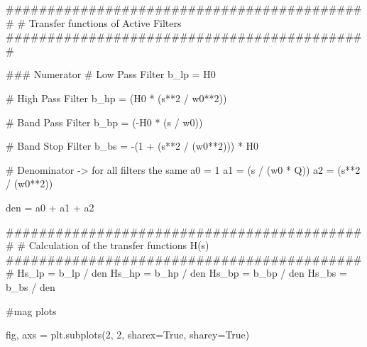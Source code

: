 \documentclass[
  letterpaper,
]{scrbook}
\newenvironment{Shaded}{}{}
\newcommand{\CommentTok}[1]{\textcolor[rgb]{0.42,0.45,0.49}{#1}}
\newcommand{\DecValTok}[1]{\textcolor[rgb]{0.00,0.36,0.77}{#1}}
\newcommand{\NormalTok}[1]{\textcolor[rgb]{0.14,0.16,0.18}{#1}}
\newcommand{\OperatorTok}[1]{\textcolor[rgb]{0.14,0.16,0.18}{#1}}
\newcommand{\VariableTok}[1]{\textcolor[rgb]{0.89,0.38,0.04}{#1}}
\begin{document}
\begin{codelisting}
{\begin{Shaded}
\begin{Highlighting}[]
\CommentTok{\#\#\#\#\#\#\#\#\#\#\#\#\#\#\#\#\#\#\#\#\#\#\#\#\#\#\#\#\#\#\#\#\#\#\#\#\#\#\#\#\#\#\#\#}
\CommentTok{\# Transfer functions of Active Filters}
\CommentTok{\#\#\#\#\#\#\#\#\#\#\#\#\#\#\#\#\#\#\#\#\#\#\#\#\#\#\#\#\#\#\#\#\#\#\#\#\#\#\#\#\#\#\#\#}


\CommentTok{\#\#\# Numerator}
\CommentTok{\# Low Pass Filter}
\NormalTok{b\_lp }\OperatorTok{=}\NormalTok{ H0}

\CommentTok{\# High Pass Filter}
\NormalTok{b\_hp }\OperatorTok{=}\NormalTok{ (H0 }\OperatorTok{*}\NormalTok{ (s}\OperatorTok{**}\DecValTok{2} \OperatorTok{/}\NormalTok{ w0}\OperatorTok{**}\DecValTok{2}\NormalTok{))}

\CommentTok{\# Band Pass Filter}
\NormalTok{b\_bp }\OperatorTok{=}\NormalTok{ (}\OperatorTok{{-}}\NormalTok{H0 }\OperatorTok{*}\NormalTok{ (s }\OperatorTok{/}\NormalTok{ w0))}

\CommentTok{\# Band Stop Filter}
\NormalTok{b\_bs }\OperatorTok{=} \OperatorTok{{-}}\NormalTok{(}\DecValTok{1} \OperatorTok{+}\NormalTok{ (s}\OperatorTok{**}\DecValTok{2} \OperatorTok{/}\NormalTok{ (w0}\OperatorTok{**}\DecValTok{2}\NormalTok{))) }\OperatorTok{*}\NormalTok{ H0}

\CommentTok{\# Denominator {-}\textgreater{} for all filters the same}
\NormalTok{a0 }\OperatorTok{=} \DecValTok{1}
\NormalTok{a1 }\OperatorTok{=}\NormalTok{ (s }\OperatorTok{/}\NormalTok{ (w0 }\OperatorTok{*}\NormalTok{ Q))}
\NormalTok{a2 }\OperatorTok{=}\NormalTok{ (s}\OperatorTok{**}\DecValTok{2} \OperatorTok{/}\NormalTok{ (w0}\OperatorTok{**}\DecValTok{2}\NormalTok{))}

\NormalTok{den }\OperatorTok{=}\NormalTok{ a0 }\OperatorTok{+}\NormalTok{ a1 }\OperatorTok{+}\NormalTok{ a2}

\CommentTok{\#\#\#\#\#\#\#\#\#\#\#\#\#\#\#\#\#\#\#\#\#\#\#\#\#\#\#\#\#\#\#\#\#\#\#\#\#\#\#\#\#\#\#\#}
\CommentTok{\# Calculation of the transfer functions H(s)}
\CommentTok{\#\#\#\#\#\#\#\#\#\#\#\#\#\#\#\#\#\#\#\#\#\#\#\#\#\#\#\#\#\#\#\#\#\#\#\#\#\#\#\#\#\#\#\#}
\NormalTok{Hs\_lp }\OperatorTok{=}\NormalTok{ b\_lp }\OperatorTok{/}\NormalTok{ den}
\NormalTok{Hs\_hp }\OperatorTok{=}\NormalTok{ b\_hp }\OperatorTok{/}\NormalTok{ den}
\NormalTok{Hs\_bp }\OperatorTok{=}\NormalTok{ b\_bp }\OperatorTok{/}\NormalTok{ den}
\NormalTok{Hs\_bs }\OperatorTok{=}\NormalTok{ b\_bs }\OperatorTok{/}\NormalTok{ den}

\CommentTok{\#mag plots}

\NormalTok{fig, axs }\OperatorTok{=}\NormalTok{ plt.subplots(}\DecValTok{2}\NormalTok{, }\DecValTok{2}\NormalTok{, sharex}\OperatorTok{=}\VariableTok{True}\NormalTok{, sharey}\OperatorTok{=}\VariableTok{True}\NormalTok{)}


\end{Highlighting}
\end{Shaded}}
\end{codelisting}
\end{document}
